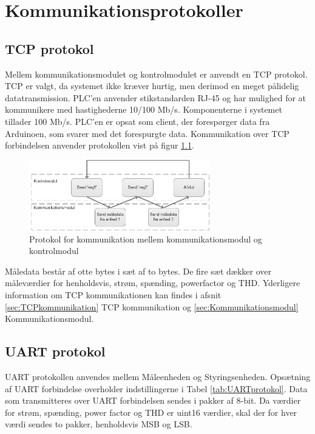 
\chapter{Kommunikationsprotokoller}
\label{ch:KomProtokol}

\section{TCP protokol}
\label{sec:TCPprotokol}
Mellem kommunikationsmodulet og kontrolmodulet er anvendt en TCP protokol. TCP er valgt, da systemet ikke kræver hurtig, men derimod en meget pålidelig datatransmission. PLC'en anvender stikstandarden RJ-45 og har mulighed for at kommunikere med hastighederne 10/100 Mb/s. Komponenterne i systemet tillader 100 Mb/s.
PLC'en er opsat som client, der forespørger data fra Arduinoen, som svarer med det forespurgte data. Kommunikation over TCP forbindelsen anvender protokollen vist på figur \ref{fig:TCPprotokol}.

\begin{figure}[H] %
	\centering
	\includegraphics[width=0.7\textwidth]{Figure/TCPprotokol}
	\caption{Protokol for kommunikation mellem kommunikationsmodul og kontrolmodul}
	\label{fig:TCPprotokol}
\end{figure}

Måledata består af otte bytes i sæt af to bytes. De fire sæt dækker over måleværdier for henholdsvis, strøm, spænding, powerfactor og THD. Yderligere information om TCP kommunikationen kan findes i afsnit \ref{sec:TCPkommunikation} TCP kommunikation og \ref{sec:Kommunikationsmodul} Kommunikationsmodul.

\section{UART protokol}
\label{sec:UARTprotokol}
UART protokollen anvendes mellem Måleenheden og Styringsenheden. Opsætning af UART forbindelse overholder indstillingerne i Tabel \ref{tab:UARTprotokol}. Data som transmitteres over UART forbindelsen sendes i pakker af 8-bit. Da værdier for strøm, spænding, power factor og THD er uint16 værdier, skal der for hver værdi sendes to pakker, henholdsvis MSB og LSB. 


